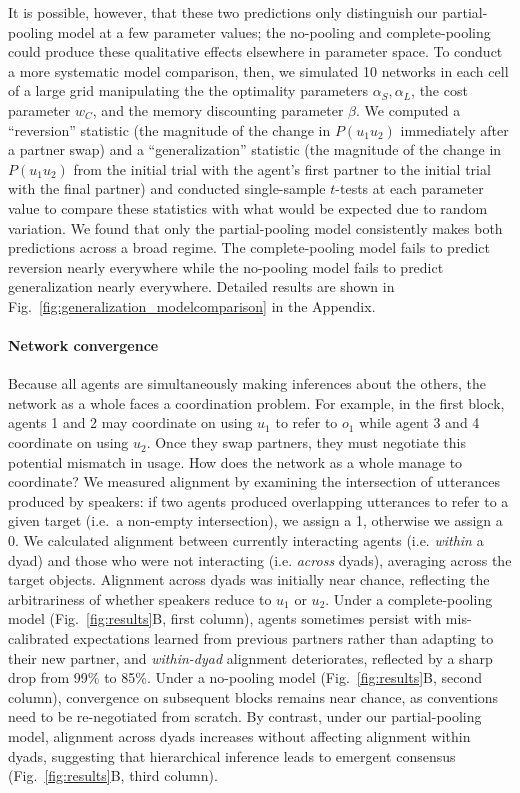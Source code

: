 It is possible, however, that these two predictions only distinguish our partial-pooling model at a few parameter values; the no-pooling and complete-pooling could produce these qualitative effects elsewhere in parameter space.
To conduct a more systematic model comparison, then, we simulated 10 networks in each cell of a large grid manipulating the the optimality parameters $\alpha_S,\alpha_L$, the cost parameter $w_C$, and the memory discounting parameter $\beta$. 
We computed a ``reversion'' statistic (the magnitude of the change in $P(u_1u_2)$ immediately after a partner swap) and a ``generalization'' statistic (the magnitude of the change in $P(u_1u_2)$ from the initial trial with the agent's first partner to the initial trial with the final partner) and conducted single-sample $t$-tests at each parameter value to compare these statistics with what would be expected due to random variation.
We found that only the partial-pooling model consistently makes both predictions across a broad regime. 
The complete-pooling model fails to predict reversion nearly everywhere while the no-pooling model fails to predict generalization nearly everywhere.
Detailed results are shown in Fig.~\ref{fig:generalization_modelcomparison} in the Appendix.

\paragraph{Network convergence}

Because all agents are simultaneously making inferences about the others, the network as a whole faces a coordination problem.
For example, in the first block, agents 1 and 2 may coordinate on using $u_1$ to refer to $o_1$ while agent 3 and 4 coordinate on using $u_2$. 
Once they swap partners, they must negotiate this potential mismatch in usage. 
How does the network as a whole manage to coordinate?
We measured alignment by examining the intersection of utterances produced by speakers: if two agents produced overlapping utterances to refer to a given target (i.e.~a non-empty intersection), we assign a 1, otherwise we assign a 0.
We calculated alignment between currently interacting agents (i.e. \emph{within} a dyad) and those who were not interacting (i.e. \emph{across} dyads), averaging across the target objects.
Alignment across dyads was initially near chance, reflecting the arbitrariness of whether speakers reduce to $u_1$ or $u_2$. 
Under a complete-pooling model (Fig.~\ref{fig:results}B, first column), agents sometimes persist with mis-calibrated expectations learned from previous partners rather than adapting to their new partner, and \emph{within-dyad} alignment deteriorates, reflected by a sharp drop from 99\% to 85\%.
Under a no-pooling model (Fig.~\ref{fig:results}B, second column), convergence on subsequent blocks remains near chance, as conventions need to be re-negotiated from scratch.
By contrast, under our partial-pooling model, alignment across dyads increases without affecting alignment within dyads, suggesting that hierarchical inference leads to emergent consensus (Fig.~\ref{fig:results}B, third column).

